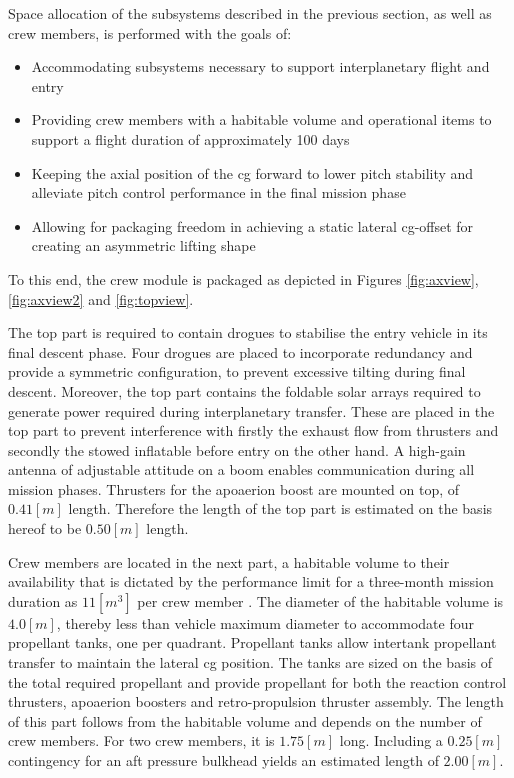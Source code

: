 Space allocation of the subsystems described in the previous section, as well as crew members, is performed with the goals of:
\begin{itemize}
\item Accommodating subsystems necessary to support interplanetary flight and entry
\item Providing crew members with a habitable volume and operational items to support a flight duration of approximately 100 days
\item Keeping the axial position of the \gls{cg} forward to lower pitch stability and alleviate pitch control performance in the final mission phase
\item Allowing for packaging freedom in achieving a static lateral \gls{cg}-offset for creating an asymmetric lifting shape
\end{itemize}
To this end, the crew module is packaged as depicted in Figures \ref{fig:axview}, \ref{fig:axview2} and \ref{fig:topview}. 

The top part is required to contain drogues to stabilise the entry vehicle in its final descent phase. Four drogues are placed to incorporate redundancy and provide a symmetric configuration, to prevent excessive tilting during final descent. Moreover, the top part contains the foldable solar arrays required to generate power required during interplanetary transfer. These are placed in the top part to prevent interference with firstly the exhaust flow from thrusters and secondly the stowed inflatable before entry on the other hand. A high-gain antenna of adjustable attitude on a boom enables communication during all mission phases. Thrusters for the apoaerion boost are mounted on top, of $0.41 \left[m\right]$ length. Therefore the length of the top part is estimated on the basis hereof to be $0.50 \left[m\right]$ length.

Crew members are located in the next part, a habitable volume to their availability that is dictated by the performance limit for a three-month mission duration as $11 \left[m^{3}\right]$ per crew member \cite{Rudisill2008}. The diameter of the habitable volume is $4.0 \left[m\right]$, thereby less than vehicle maximum diameter to accommodate four propellant tanks, one per quadrant. Propellant tanks allow intertank propellant transfer to maintain the lateral \gls{cg} position. The tanks are sized on the basis of the total required propellant and provide propellant for both the reaction control thrusters, apoaerion boosters and retro-propulsion thruster assembly. The length of this part follows from the habitable volume and depends on the number of crew members. For two crew members, it is $1.75 \left[m\right]$ long. Including a $0.25 \left[m\right]$ contingency for an aft pressure bulkhead yields an estimated length of $2.00 \left[m\right]$.

